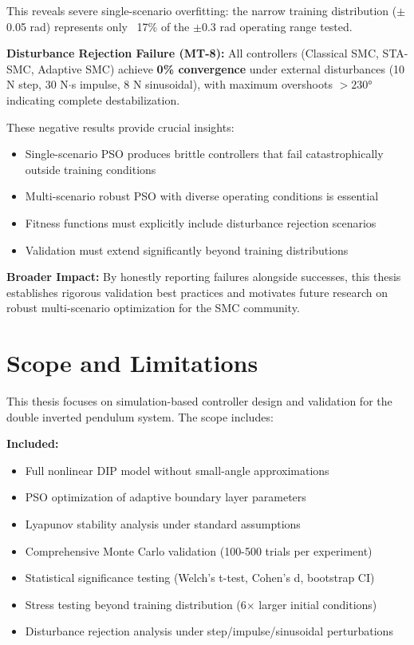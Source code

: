 \documentclass[12pt,a4paper,oneside]{report}
\begin{document}
This reveals severe single-scenario overfitting: the narrow training distribution ($\pm$0.05 rad) represents only ~17\% of the $\pm$0.3 rad operating range tested.

\textbf{Disturbance Rejection Failure (MT-8):} All controllers (Classical SMC, STA-SMC, Adaptive SMC) achieve \textbf{0\% convergence} under external disturbances (10 N step, 30 N$\cdot$s impulse, 8 N sinusoidal), with maximum overshoots $>230°$ indicating complete destabilization.

These negative results provide crucial insights:
\begin{itemize}
\item Single-scenario PSO produces brittle controllers that fail catastrophically outside training conditions
\item Multi-scenario robust PSO with diverse operating conditions is essential
\item Fitness functions must explicitly include disturbance rejection scenarios
\item Validation must extend significantly beyond training distributions
\end{itemize}

\textbf{Broader Impact:} By honestly reporting failures alongside successes, this thesis establishes rigorous validation best practices and motivates future research on robust multi-scenario optimization for the SMC community.

\section{Scope and Limitations}

This thesis focuses on simulation-based controller design and validation for the double inverted pendulum system. The scope includes:

\textbf{Included:}
\begin{itemize}
\item Full nonlinear DIP model without small-angle approximations
\item PSO optimization of adaptive boundary layer parameters
\item Lyapunov stability analysis under standard assumptions
\item Comprehensive Monte Carlo validation (100-500 trials per experiment)
\item Statistical significance testing (Welch's t-test, Cohen's d, bootstrap CI)
\item Stress testing beyond training distribution (6$\times$ larger initial conditions)
\item Disturbance rejection analysis under step/impulse/sinusoidal perturbations
\end{itemize}
\end{document}
